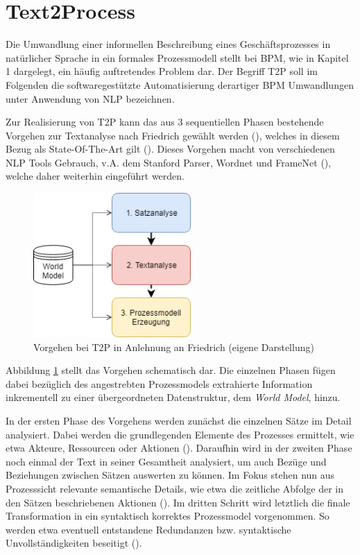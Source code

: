 \section{Text2Process}


Die Umwandlung einer informellen Beschreibung eines Geschäftsprozesses in na\-tür\-li\-cher Sprache in ein formales Prozessmodell stellt bei \ac{BPM}, wie in Kapitel 1 dargelegt, ein häufig auftretendes Problem dar. 
Der Begriff \ac{T2P} soll im Folgenden die softwaregestützte Automatisierung derartiger \ac{BPM} Umwandlungen unter Anwendung von \ac{NLP} bezeichnen.\par
Zur Realisierung von \ac{T2P} kann das aus 3 sequentiellen Phasen bestehende Vorgehen zur Textanalyse nach Friedrich gewählt werden (\cite[vgl.][4 ff.]{FRIEDRICH2}), welches in diesem Bezug als State-Of-The-Art gilt (\cite[vgl.][11]{RIEFER}). Dieses Vorgehen macht von verschiedenen \ac{NLP} Tools Gebrauch, v.A. dem Stanford Parser, Wordnet und FrameNet (\cite[vgl.][11]{RIEFER}), welche daher weiterhin eingeführt werden.
\begin{figure}
\includegraphics[width=6cm]{pictures/T2P_highlevel.png}
\caption{Vorgehen bei T2P in Anlehnung an Friedrich (eigene Darstellung)}
\label{fig:T2PHL}
\end{figure}
Abbildung \ref{fig:T2PHL} stellt das Vorgehen schematisch dar. Die einzelnen Phasen fügen dabei bezüglich des angestrebten Prozessmodels extrahierte Information inkrementell zu einer übergeordneten Datenstruktur, dem \textit{World Model}, hinzu.\par
In der ersten Phase des Vorgehens werden zunächst die einzelnen Sätze im Detail analysiert. Dabei werden die grundlegenden Elemente des Prozesses ermittelt, wie etwa Akteure, Ressourcen oder Aktionen (\cite[vgl.][47 ff.]{FRIEDRICH1}). Daraufhin wird in der zweiten Phase noch einmal der Text in seiner Gesamtheit analysiert, um auch Bezüge und Beziehungen zwischen Sätzen auswerten zu können. Im Fokus stehen nun aus Prozesssicht relevante semantische Details, wie etwa die zeitliche Abfolge der in den Sätzen beschriebenen Aktionen (\cite[vgl.][66 ff.]{FRIEDRICH1}). Im dritten Schritt wird letztlich die finale Transformation in ein syntaktisch korrektes Prozessmodel vorgenommen. So werden etwa  eventuell entstandene Redundanzen bzw. syntaktische Unvollständigkeiten beseitigt (\cite[vgl.][90 ff.]{FRIEDRICH1}).
